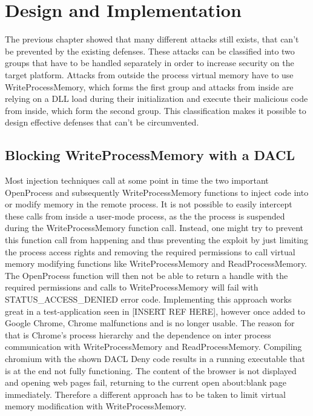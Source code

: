 \section{Design and Implementation}
\label{chap_implementation}
The previous chapter showed that many different attacks still exists, that can't be prevented by the existing defenses. These attacks can be classified into two groups that have to be handled separately in order to increase security on the target platform. Attacks from outside the process virtual memory have to use WriteProcessMemory, which forms the first group and attacks from inside are relying on a DLL load during their initialization and execute their malicious code from inside, which form the second group. This classification makes it possible to design effective defenses that can't be circumvented. 

\subsection{Blocking WriteProcessMemory with a DACL}
\label{sec:implementation_dacl}
Most injection techniques call at some point in time the two important OpenProcess and subsequently WriteProcessMemory functions to inject code into or modify memory in the remote process. It is not possible to easily intercept these calls from inside a user-mode process, as the the process is suspended during the WriteProcessMemory function call. Instead, one might try to prevent this function call from happening and thus preventing the exploit by just limiting the process access rights and removing the required permissions to call virtual memory modifying functions like WriteProcessMemory and ReadProcessMemory. The OpenProcess function will then not be able to return a handle with the required permissions and calls to WriteProcessMemory will fail with STATUS\_ACCESS\_DENIED error code. Implementing this approach works great in a test-application seen in [INSERT REF HERE], however once added to Google Chrome, Chrome malfunctions and is no longer usable. The reason for that is Chrome's process hierarchy and the dependence on inter process communication with WriteProcessMemory and ReadProcessMemory. Compiling chromium with the shown DACL Deny code results in a running executable that is at the end not fully functioning. The content of the browser is not displayed and opening web pages fail, returning to the current open about:blank page immediately. Therefore a different approach has to be taken to limit virtual memory modification with WriteProcessMemory.

